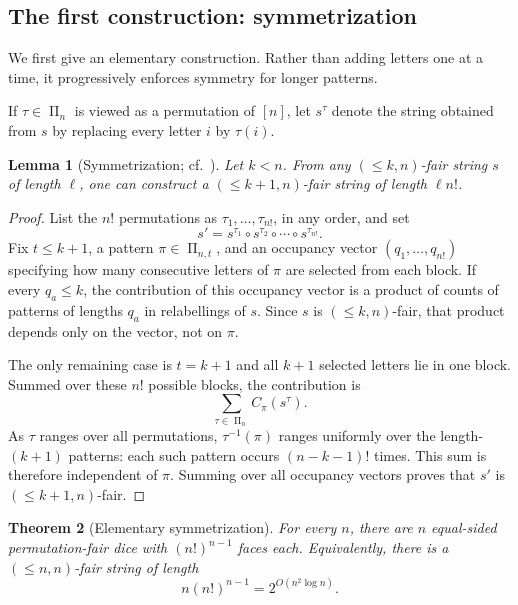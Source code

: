 \documentclass[11pt]{article}
\newtheorem{theorem}{Theorem}[section]
\newtheorem{lemma}[theorem]{Lemma}
\theoremstyle{definition}
\theoremstyle{remark}
\newcommand{\PiSet}{\mathop{\Pi}}
\newcommand{\concat}{\mathbin{\circ}}
\begin{document}
\subsection{The first construction: symmetrization}\label{sec:first}

We first give an elementary construction.  Rather than adding letters one at
a time, it progressively enforces symmetry for longer patterns.

If \(\tau\in\PiSet_n\) is viewed as a permutation of \([n]\), let \(s^\tau\)
denote the string obtained from \(s\) by replacing every letter \(i\) by
\(\tau(i)\).

\begin{lemma}[Symmetrization; cf.\ \cite{purcell}]\label{lem:symmetrize}
Let \(k<n\).  From any \((\leq k,n)\)-fair string \(s\) of length \(\ell\), one
can construct a \((\leq k+1,n)\)-fair string of length \(\ell n!\).
\end{lemma}

\begin{proof}
List the \(n!\) permutations as \(\tau_1,\ldots,\tau_{n!}\), in any order, and
set
\[
  s'=s^{\tau_1}\concat s^{\tau_2}\concat\cdots\concat s^{\tau_{n!}}.
\]
Fix \(t\leq k+1\), a pattern \(\pi\in\PiSet_{n,t}\), and an occupancy vector
\((q_1,\ldots,q_{n!})\) specifying how many consecutive letters of \(\pi\) are
selected from each block.  If every \(q_a\leq k\), the contribution of this
occupancy vector is a product of counts of patterns of lengths \(q_a\) in
relabellings of \(s\).  Since \(s\) is \((\leq k,n)\)-fair, that product
depends only on the vector, not on \(\pi\).

The only remaining case is \(t=k+1\) and all \(k+1\) selected letters lie in
one block.  Summed over these \(n!\) possible blocks, the contribution is
\[
  \sum_{\tau\in\PiSet_n} C_\pi(s^\tau).
\]
As \(\tau\) ranges over all permutations, \(\tau^{-1}(\pi)\) ranges uniformly
over the length-\((k+1)\) patterns: each such pattern occurs
\((n-k-1)!\) times.  This sum is therefore independent of \(\pi\).  Summing
over all occupancy vectors proves that \(s'\) is
\((\leq k+1,n)\)-fair.
\end{proof}

\begin{theorem}[Elementary symmetrization]\label{thm:first-size}
For every \(n\), there are \(n\) equal-sided permutation-fair dice with
\((n!)^{n-1}\) faces each.  Equivalently, there is a
\((\leq n,n)\)-fair string of length
\[
  n(n!)^{n-1}=2^{O(n^2\log n)}.
\]
\end{theorem}
\end{document}
